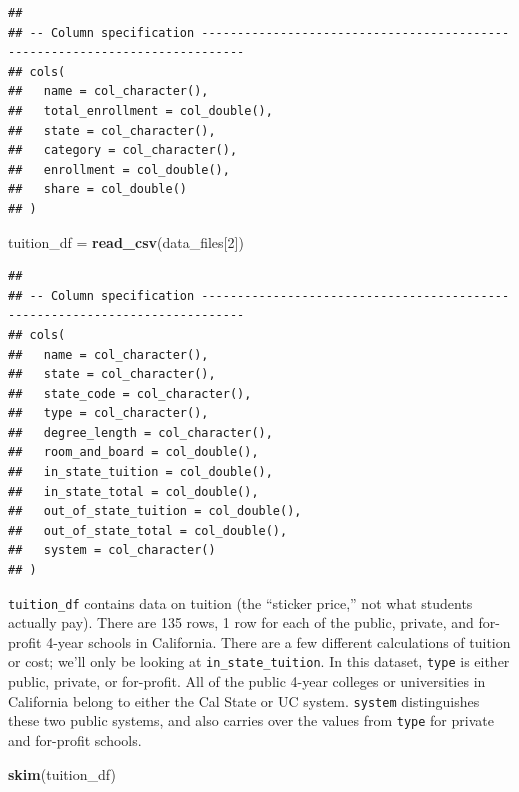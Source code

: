 \documentclass[
]{article}
\newenvironment{Shaded}{\begin{snugshade}}{\end{snugshade}}
\newcommand{\DecValTok}[1]{\textcolor[rgb]{0.00,0.00,0.81}{#1}}
\newcommand{\KeywordTok}[1]{\textcolor[rgb]{0.13,0.29,0.53}{\textbf{#1}}}
\newcommand{\NormalTok}[1]{#1}
\newcommand{\StringTok}[1]{\textcolor[rgb]{0.31,0.60,0.02}{#1}}
\begin{document}
\begin{verbatim}
## 
## -- Column specification ----------------------------------------------------------------------------
## cols(
##   name = col_character(),
##   total_enrollment = col_double(),
##   state = col_character(),
##   category = col_character(),
##   enrollment = col_double(),
##   share = col_double()
## )
\end{verbatim}

\begin{Shaded}
\begin{Highlighting}[]
\NormalTok{tuition\_df =}\StringTok{ }\KeywordTok{read\_csv}\NormalTok{(data\_files[}\DecValTok{2}\NormalTok{])}
\end{Highlighting}
\end{Shaded}

\begin{verbatim}
## 
## -- Column specification ----------------------------------------------------------------------------
## cols(
##   name = col_character(),
##   state = col_character(),
##   state_code = col_character(),
##   type = col_character(),
##   degree_length = col_character(),
##   room_and_board = col_double(),
##   in_state_tuition = col_double(),
##   in_state_total = col_double(),
##   out_of_state_tuition = col_double(),
##   out_of_state_total = col_double(),
##   system = col_character()
## )
\end{verbatim}

\texttt{tuition\_df} contains data on tuition (the ``sticker price,'' not what students actually pay). There are 135 rows, 1 row for each of the public, private, and for-profit 4-year schools in California. There are a few different calculations of tuition or cost; we'll only be looking at \texttt{in\_state\_tuition}.
In this dataset, \texttt{type} is either public, private, or for-profit. All of the public 4-year colleges or universities in California belong to either the Cal State or UC system. \texttt{system} distinguishes these two public systems, and also carries over the values from \texttt{type} for private and for-profit schools.

\begin{Shaded}
\begin{Highlighting}[]
\KeywordTok{skim}\NormalTok{(tuition\_df)}
\end{Highlighting}
\end{Shaded}
\end{document}
